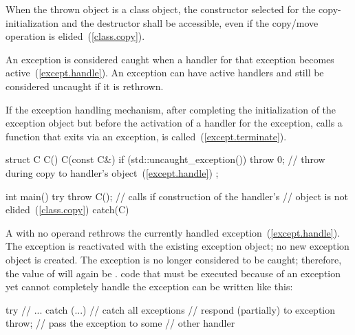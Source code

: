 \pnum
{}%
%
When the thrown object is a class object, the constructor selected for
the copy-initialization and the
destructor shall be accessible, even if the copy/move operation is
elided~(\ref{class.copy}).

\pnum
{}%
%
%
An exception is considered caught when a handler for that exception
becomes active~(\ref{except.handle}).
\enternote
An exception can have active handlers and still be considered uncaught if
it is rethrown.
\exitnote

\pnum
{}%
%
If the exception handling mechanism, after completing the initialization of the
exception object but before the activation of a handler for the exception,
calls a function that exits via an
exception,  is called~(\ref{except.terminate}). \enterexample

\begin{codeblock}
struct C {
  C() { }
  C(const C&) {
    if (std::uncaught_exception()) {
      throw 0;      // throw during copy to handler's  object~(\ref{except.handle})
    }
  }
};

int main() {
  try {
    throw C();      // calls  if construction of the handler's
                    //  object is not elided~(\ref{class.copy})
  } catch(C) { }
}
\end{codeblock}

\exitexample

\pnum
{}%
A
with no operand rethrows the currently handled exception~(\ref{except.handle}).
The exception is reactivated with the existing exception object;
no new exception object is created.
The exception
is no longer considered to be caught; therefore, the value
of
will again be
.
\enterexample
code that must be executed because of an exception yet cannot
completely handle the exception can be written like this:
\begin{codeblock}
try {
    // ...
} catch (...) {     // catch all exceptions
  // respond (partially) to exception
  throw;            // pass the exception to some
                    // other handler
}
\end{codeblock}
\exitexample

